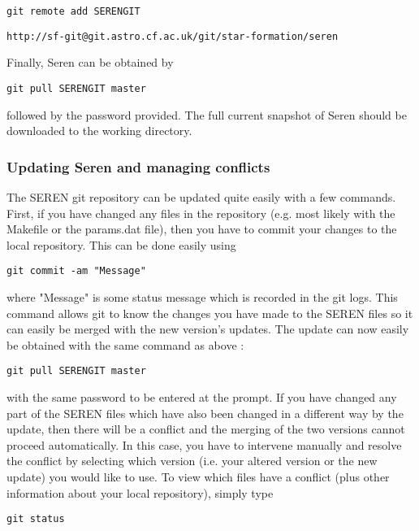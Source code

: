 \documentclass[a4paper]{article}
\newcommand{\NAME}{SEREN }
\newcommand{\var}[1]{\texttt{#1}}
\begin{document}
\var{git remote add SERENGIT } %

\var{http://sf-git@git.astro.cf.ac.uk/git/star-formation/seren}\newline

\noindent Finally, Seren can be obtained by \newline

\var{git pull SERENGIT master} \newline

\noindent followed by the password provided.  The full current snapshot of Seren should be downloaded to the working directory.



\subsubsection{Updating Seren and managing conflicts}
The \NAME git repository can be updated quite easily with a few commands. 
First, if you have changed any files in the repository (e.g. most likely 
with the Makefile or the params.dat file), then you have to commit your 
changes to the local repository.  This can be done easily using \newline

\var{git commit -am "Message"} \newline

\noindent where "Message" is some status message which is recorded in the git logs.  This command allows git to know the changes you have made to the \NAME files so it can easily be merged with the new version's updates.  The update can now easily be obtained with the same command as above : \newline

\var{git pull SERENGIT master} \newline

\noindent with the same password to be entered at the prompt.  If you have changed any part of the \NAME files which have also been changed in a different way by the update, then there will be a conflict and the merging of the two versions cannot proceed automatically.  In this case, you have to intervene manually and resolve the conflict by selecting which version (i.e. your altered version or the new update) you would like to use.  To view which files have a conflict (plus other information about your local repository), simply type \newline

\var{git status} \newline
\end{document}
